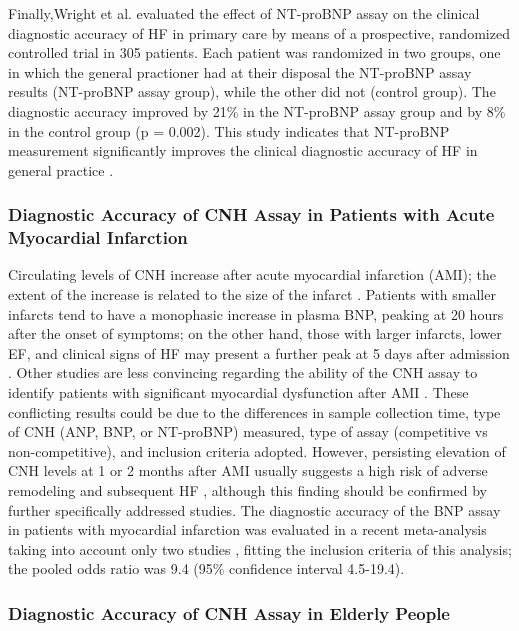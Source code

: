 \documentclass[14pt,a4paper,onecolumn]{extarticle}
\begin{document}
Finally,Wright et al. \citep{bib3133} evaluated the effect of NT-proBNP assay on the clinical diagnostic accuracy of HF in primary care by means of a prospective, randomized controlled trial in 305 patients. Each patient was randomized in two groups, one in which
the general practioner had at their disposal the NT-proBNP assay results (NT-proBNP
assay group), while the other did not (control group). The diagnostic accuracy improved
by 21\% in the NT-proBNP assay group and by 8\% in the control group (p = 0.002). This
study indicates that NT-proBNP measurement significantly improves the clinical diagnostic accuracy of HF in general practice \citep{bib3133}.


\subsubsection{ Diagnostic Accuracy of CNH Assay in Patients with Acute Myocardial Infarction}

Circulating levels of CNH increase after acute myocardial infarction (AMI); the extent
of the increase is related to the size of the infarct \citep{bib3134} \citep{bib3135} \citep{bib3136} \citep{bib3137}. Patients with smaller infarcts
tend to have a monophasic increase in plasma BNP, peaking at 20 hours after the onset
of symptoms; on the other hand, those with larger infarcts, lower EF, and clinical signs
of HF may present a further peak at 5 days after admission \citep{bib3135}. Other studies are less
convincing regarding the ability of the CNH assay to identify patients with significant
myocardial dysfunction after AMI \citep{bib3138} \citep{bib3139}. These conflicting results could be due to
the differences in sample collection time, type of CNH (ANP, BNP, or NT-proBNP) measured, type of assay (competitive vs non-competitive), and inclusion criteria adopted. However, persisting elevation of CNH levels at 1 or 2 months after AMI usually suggests a high
risk of adverse remodeling and subsequent HF \citep{bib35}, although this finding should be confirmed by further specifically addressed studies.
The diagnostic accuracy of the BNP assay in patients with myocardial infarction
was evaluated in a recent meta-analysis \citep{bib372} taking into account only two studies
\citep{bib3140} \citep{bib3141}, fitting the inclusion criteria of this analysis; the pooled odds ratio was 9.4
(95\% confidence interval 4.5-19.4).

\subsubsection{ Diagnostic Accuracy of CNH Assay in Elderly People}
\end{document}
